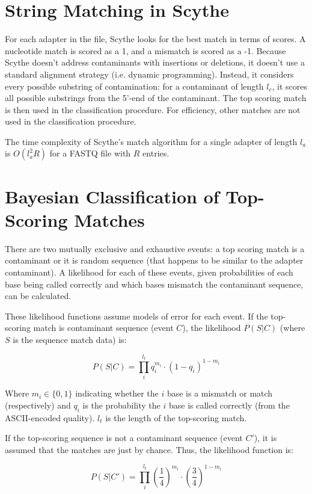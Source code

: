 \documentclass{bioinfo}
\begin{document}
\begin{methods}
\section{String Matching in Scythe}

For each adapter in the file, Scythe looks for the best match in
terms of scores. A nucleotide match is scored as a 1, and a mismatch
is scored as a -1. Because Scythe doesn't address contaminants with
insertions or deletions, it doesn't use a standard alignment strategy
(i.e. dynamic programming). Instead, it considers every possible
substring of contamination: for a contaminant of length $l_c$, it
scores all possible substrings from the 5'-end of the contaminant. The
top scoring match is then used in the classification procedure. For
efficiency, other matches are not used in the classification
procedure.

The time complexity of Scythe's match algorithm for a single adapter
of length $l_a$ is $O(l_a^2 R)$ for a FASTQ file with $R$ entries.


\section{Bayesian Classification of Top-Scoring Matches}

There are two mutually exclusive and exhaustive events: a top scoring
match is a contaminant or it is random sequence (that happens to be
similar to the adapter contaminant). A likelihood for each of these
events, given probabilities of each base being called correctly and
which bases mismatch the contaminant sequence, can be calculated.

These likelihood functions assume models of error for each event. If
the top-scoring match is contaminant sequence (event $C$), the
likelihood $P(S | C)$ (where $S$ is the sequence match data) is:

$$ P(S | C) = \prod_i^{l_t} q_i^{m_i} \cdot (1-q_i)^{1 - m_i} $$

Where $m_i \in \{0, 1\}$ indicating whether the $i$ base is a
mismatch or match (respectively) and $q_i$ is the probability the $i$
base is called correctly (from the ASCII-encoded quality). $l_t$ is
the length of the top-scoring match.

If the top-scoring sequence is not a contaminant sequence (event
$C'$), it is assumed that the matches are just by chance. Thus, the
likelihood function is:

$$ P(S | C') = \prod_i^{l_t} \left(\frac{1}{4}\right)^{m_i} \cdot \left(\frac{3}{4}\right)^{1 - m_i} $$


\end{methods}
\end{document}
